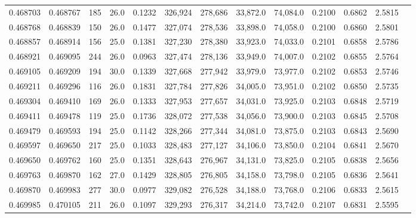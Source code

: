 \begin{tabular}{rrrrrrrrrrrrr}
0.468703 & 0.468767 &   185 & 26.0 &                                     0.1232 & 326,924 & 278,686 &  33,872.0 &  74,084.0 & 0.2100 & 0.6862 & 2.5815 \\
0.468768 & 0.468839 &   150 & 26.0 &                                     0.1477 & 327,074 & 278,536 &  33,898.0 &  74,058.0 & 0.2100 & 0.6860 & 2.5801 \\
0.468857 & 0.468914 &   156 & 25.0 &                                     0.1381 & 327,230 & 278,380 &  33,923.0 &  74,033.0 & 0.2101 & 0.6858 & 2.5786 \\
0.468921 & 0.469095 &   244 & 26.0 &                                     0.0963 & 327,474 & 278,136 &  33,949.0 &  74,007.0 & 0.2102 & 0.6855 & 2.5764 \\
0.469105 & 0.469209 &   194 & 30.0 &                                     0.1339 & 327,668 & 277,942 &  33,979.0 &  73,977.0 & 0.2102 & 0.6853 & 2.5746 \\
0.469211 & 0.469296 &   116 & 26.0 &                                     0.1831 & 327,784 & 277,826 &  34,005.0 &  73,951.0 & 0.2102 & 0.6850 & 2.5735 \\
0.469304 & 0.469410 &   169 & 26.0 &                                     0.1333 & 327,953 & 277,657 &  34,031.0 &  73,925.0 & 0.2103 & 0.6848 & 2.5719 \\
0.469411 & 0.469478 &   119 & 25.0 &                                     0.1736 & 328,072 & 277,538 &  34,056.0 &  73,900.0 & 0.2103 & 0.6845 & 2.5708 \\
0.469479 & 0.469593 &   194 & 25.0 &                                     0.1142 & 328,266 & 277,344 &  34,081.0 &  73,875.0 & 0.2103 & 0.6843 & 2.5690 \\
0.469597 & 0.469650 &   217 & 25.0 &                                     0.1033 & 328,483 & 277,127 &  34,106.0 &  73,850.0 & 0.2104 & 0.6841 & 2.5670 \\
0.469650 & 0.469762 &   160 & 25.0 &                                     0.1351 & 328,643 & 276,967 &  34,131.0 &  73,825.0 & 0.2105 & 0.6838 & 2.5656 \\
0.469763 & 0.469870 &   162 & 27.0 &                                     0.1429 & 328,805 & 276,805 &  34,158.0 &  73,798.0 & 0.2105 & 0.6836 & 2.5641 \\
0.469870 & 0.469983 &   277 & 30.0 &                                     0.0977 & 329,082 & 276,528 &  34,188.0 &  73,768.0 & 0.2106 & 0.6833 & 2.5615 \\
0.469985 & 0.470105 &   211 & 26.0 &                                     0.1097 & 329,293 & 276,317 &  34,214.0 &  73,742.0 & 0.2107 & 0.6831 & 2.5595 \\

\end{tabular}
